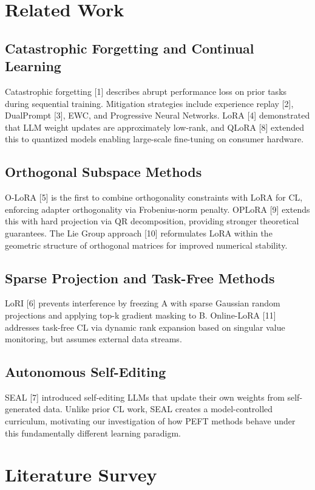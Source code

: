\documentclass[10pt,journal,compsoc]{IEEEtran}
\begin{document}
\section{Related Work}

\subsection{Catastrophic Forgetting and Continual Learning}
Catastrophic forgetting [1] describes abrupt performance loss on prior tasks during sequential training. Mitigation strategies include experience replay [2], DualPrompt [3], EWC, and Progressive Neural Networks. LoRA [4] demonstrated that LLM weight updates are approximately low-rank, and QLoRA [8] extended this to quantized models enabling large-scale fine-tuning on consumer hardware.

\subsection{Orthogonal Subspace Methods}
O-LoRA [5] is the first to combine orthogonality constraints with LoRA for CL, enforcing adapter orthogonality via Frobenius-norm penalty. OPLoRA [9] extends this with hard projection via QR decomposition, providing stronger theoretical guarantees. The Lie Group approach [10] reformulates LoRA within the geometric structure of orthogonal matrices for improved numerical stability.

\subsection{Sparse Projection and Task-Free Methods}
LoRI [6] prevents interference by freezing A with sparse Gaussian random projections and applying top-k gradient masking to B. Online-LoRA [11] addresses task-free CL via dynamic rank expansion based on singular value monitoring, but assumes external data streams.

\subsection{Autonomous Self-Editing}
SEAL [7] introduced self-editing LLMs that update their own weights from self-generated data. Unlike prior CL work, SEAL creates a model-controlled curriculum, motivating our investigation of how PEFT methods behave under this fundamentally different learning paradigm.

\section{Literature Survey}
\end{document}
